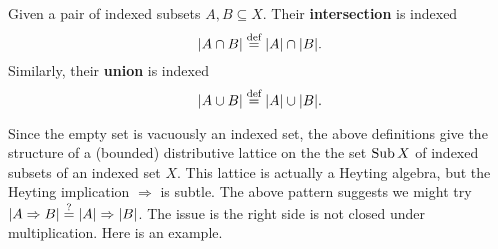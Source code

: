 \documentclass[../main.tex]{subfiles}
\begin{document}
\begin{definition}
  Given a pair of indexed subsets \(A,B \subseteq X\). Their
  \textbf{intersection} is indexed
  \[%
    \abs{A \cap B} \eqdef \abs{A} \cap \abs{B}.
  \]%
  Similarly, their \textbf{union} is indexed
  \[%
    \abs{A \cup B} \eqdef \abs{A} \cup \abs{B}.
  \]%
\end{definition}
Since the empty set is vacuously an indexed set, the above definitions give the
structure of a (bounded) distributive lattice on the the set \(\operatorname{\normalfont{\text{Sub}}}{X}\) of
indexed subsets of an indexed set \(X\). This lattice is actually a Heyting
algebra, but the Heyting implication \(\Rightarrow\) is subtle. The above
pattern suggests we might try
\({\left\vert A \Rightarrow B\right\vert} \stackrel{?}{=} {\left\vert A\right\vert} \Rightarrow {\left\vert B\right\vert}\).  The
issue is the right side is not closed under multiplication. Here is an example.
\end{document}

